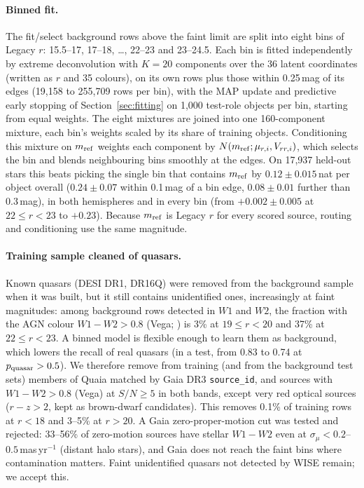 \documentclass[11pt,a4paper]{article}
\newcommand{\code}[1]{\texttt{#1}}
\begin{document}
\paragraph{Binned fit.} The fit/select background rows above the faint limit are split into eight bins of
Legacy $r$: 15.5--17, 17--18, \dots, 22--23 and 23--24.5. Each bin is fitted independently by extreme
deconvolution with $K=20$ components over the 36 latent coordinates (written as $r$ and 35 colours),
on its own rows plus those within 0.25\,mag of its edges (19,158 to 255,709 rows per bin), with the
MAP update and predictive early stopping of Section~\ref{sec:fitting} on 1,000 test-role objects per
bin, starting from equal weights. The eight mixtures are joined into one 160-component mixture, each bin's weights scaled by its
share of training objects. Conditioning this mixture on $m_{\rm ref}$ weights each component by
$N(m_{\rm ref};\mu_{r,i},V_{rr,i})$, which selects the bin and blends neighbouring bins smoothly at the
edges. On 17,937 held-out stars this beats picking the single bin that contains $m_{\rm ref}$ by
$0.12\pm0.015$\,nat per object overall ($0.24\pm0.07$ within 0.1\,mag of a bin edge, $0.08\pm0.01$ further
than 0.3\,mag), in both hemispheres and in every bin (from $+0.002\pm0.005$ at $22\le r<23$ to $+0.23$). Because $m_{\rm ref}$ is
Legacy $r$ for every scored source, routing and conditioning use the same magnitude.

\paragraph{Training sample cleaned of quasars.} Known quasars (DESI DR1, DR16Q) were removed from the
background sample when it was built, but it still contains unidentified ones, increasingly at faint
magnitudes: among background rows detected in $W1$ and $W2$, the fraction with the AGN colour
$W1-W2>0.8$ (Vega; \citealt{Stern2012}) is 3\% at $19\le r<20$ and 37\% at $22\le r<23$. A binned model
is flexible enough to learn them as background, which lowers the recall of real quasars (in a test,
from 0.83 to 0.74 at $p_{\rm quasar}>0.5$). We therefore remove from training (and from the background test sets) members of
Quaia \citep{StoreyFisher2024} matched by Gaia DR3 \code{source\_id}, and sources with $W1-W2>0.8$ (Vega)
at $S/N\ge5$ in both bands, except very red optical sources ($r-z>2$, kept as brown-dwarf candidates).
This removes 0.1\% of training rows at $r<18$ and 3--5\% at $r>20$. A Gaia zero-proper-motion cut was
tested and rejected: 33--56\% of zero-motion sources have stellar $W1-W2$ even at
$\sigma_\mu<0.2$--$0.5$\,mas\,yr$^{-1}$ (distant halo stars), and Gaia does not reach the faint bins where
contamination matters. Faint unidentified quasars not detected by WISE remain; we accept this.
\end{document}

